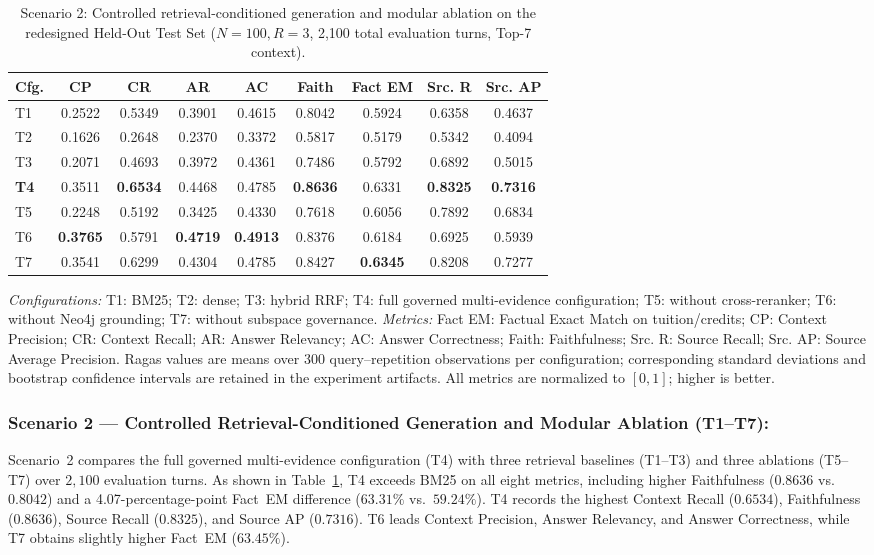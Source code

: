 \begin{table}[!htbp]
\centering
\caption{Scenario 2: Controlled retrieval-conditioned generation and modular ablation on the redesigned Held-Out Test Set ($N=100, R=3$, 2,100 total evaluation turns, Top-7 context).}
\label{tab:e2e_evaluation}
\small
\setlength{\tabcolsep}{2.4pt}
\begin{tabular}{lcccccccc}
\toprule
\textbf{Cfg.} & \textbf{CP} & \textbf{CR} & \textbf{AR} & \textbf{AC} & \textbf{Faith} & \textbf{Fact EM} & \textbf{Src. R} & \textbf{Src. AP} \\
\midrule
T1 & 0.2522 & 0.5349 & 0.3901 & 0.4615 & 0.8042 & 0.5924 & 0.6358 & 0.4637 \\
T2 & 0.1626 & 0.2648 & 0.2370 & 0.3372 & 0.5817 & 0.5179 & 0.5342 & 0.4094 \\
T3 & 0.2071 & 0.4693 & 0.3972 & 0.4361 & 0.7486 & 0.5792 & 0.6892 & 0.5015 \\
\textbf{T4} & 0.3511 & \textbf{0.6534} & 0.4468 & 0.4785 & \textbf{0.8636} & 0.6331 & \textbf{0.8325} & \textbf{0.7316} \\
T5 & 0.2248 & 0.5192 & 0.3425 & 0.4330 & 0.7618 & 0.6056 & 0.7892 & 0.6834 \\
T6 & \textbf{0.3765} & 0.5791 & \textbf{0.4719} & \textbf{0.4913} & 0.8376 & 0.6184 & 0.6925 & 0.5939 \\
T7 & 0.3541 & 0.6299 & 0.4304 & 0.4785 & 0.8427 & \textbf{0.6345} & 0.8208 & 0.7277 \\
\bottomrule
\end{tabular}
\medskip
\parbox{\columnwidth}{\footnotesize\emph{Configurations:} T1: BM25; T2: dense; T3: hybrid RRF; T4: full governed multi-evidence configuration; T5: without cross-reranker; T6: without Neo4j grounding; T7: without subspace governance. \emph{Metrics:} Fact EM: Factual Exact Match on tuition/credits; CP: Context Precision; CR: Context Recall; AR: Answer Relevancy; AC: Answer Correctness; Faith: Faithfulness; Src. R: Source Recall; Src. AP: Source Average Precision. Ragas values are means over 300 query--repetition observations per configuration; corresponding standard deviations and bootstrap confidence intervals are retained in the experiment artifacts. All metrics are normalized to $[0,1]$; higher is better.}
\end{table}

\subsubsection{Scenario 2 --- Controlled Retrieval-Conditioned Generation and Modular Ablation (T1--T7):}
Scenario~2 compares the full governed multi-evidence configuration (T4) with three retrieval baselines (T1--T3) and three ablations (T5--T7) over $2,100$ evaluation turns. As shown in Table~\ref{tab:e2e_evaluation}, T4 exceeds BM25 on all eight metrics, including higher Faithfulness ($0.8636$ vs.\ $0.8042$) and a 4.07-percentage-point Fact~EM difference ($63.31\%$ vs.\ $59.24\%$). T4 records the highest Context Recall ($0.6534$), Faithfulness ($0.8636$), Source Recall ($0.8325$), and Source AP ($0.7316$). T6 leads Context Precision, Answer Relevancy, and Answer Correctness, while T7 obtains slightly higher Fact~EM ($63.45\%$).
\FloatBarrier

